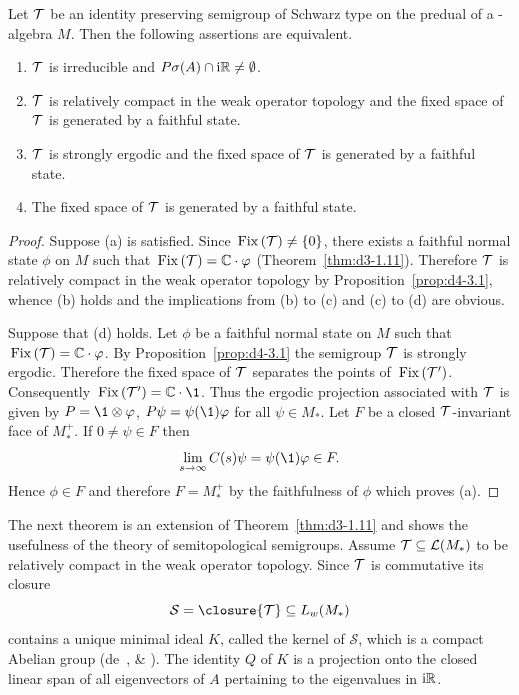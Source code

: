 \begin{proposition}\label{prop:d4-3.4}
Let $\mathcal{T}$ be an identity preserving semigroup of Schwarz type on the predual of a \WA-algebra $M$.
Then the following assertions are equivalent.
\begin{enumerate}[\upshape (a)]
\item
$\mathcal{T}$ is irreducible and $P\sigma(A) \cap \mathrm{i}\mathbb{R} \neq \emptyset$.

\item
$\mathcal{T}$ is relatively compact in the weak operator topology and the fixed space of\/ $\mathcal{T}$ is generated by a faithful state.

\item
$\mathcal{T}$ is strongly ergodic and the fixed space of\/ $\mathcal{T}$ is generated by a faithful state.

\item
The fixed space of\/ $\mathcal{T}$ is generated by a faithful state.
\end{enumerate}
\end{proposition}
\begin{proof}
Suppose (a) is satisfied.
Since $\mathop{}\mathrm{Fix}\left(\mathcal{T}\right) \neq \{0\}$, there exists a faithful normal state $\phi$ on $M$ such that 
$\Fix{\TT} = \C \cdot \phi$ (Theorem~\ref{thm:d3-1.11}).
Therefore $\mathcal{T}$ is relatively compact in the weak operator topology by Proposition~\ref{prop:d4-3.1}, whence (b) holds and the  implications from (b) to (c) and (c) to (d) are obvious.

Suppose that (d) holds.
Let $\phi$ be a faithful normal state on $M$ such that $\Fix{\TT} = \C \cdot \phi$.
By Proposition~\ref{prop:d4-3.1} the semigroup $\mathcal{T}$ is strongly ergodic.
Therefore the fixed space of\/ $\mathcal{T}$ separates the points of\/ $\mathop{}\mathrm{Fix}\left(\mathcal{T}'\right)$.
Consequently $\Fix{\TT'} = \C \cdot \1$.
Thus the ergodic projection associated with $\mathcal{T}$ is given by $P = \1 \otimes \phi$, \ie $P\psi = \psi(\1)\phi$ for all $\psi \in M_{*}$.
Let $F$ be a closed $\mathcal{T}$-invariant face of\/ $M_{*}^{+}$.
If\/ $0 \neq \psi \in F$ then
\[
\lim_{s \to \infty} C(s)\psi = \psi(\1)\phi \in F.
\]
Hence $\phi \in F$ and therefore $F = M_{*}^{+}$ by the faithfulness of\/ $\phi$ which proves (a).
\end{proof}
The next theorem is an extension of Theorem~\ref{thm:d3-1.11} and shows the usefulness of the theory of semitopological semigroups.
Assume $\mathcal{T} \subseteq \mathcal{L}(M_{*})$ to be relatively compact in the weak operator topology. 
Since $\mathcal{T}$ is commutative its closure 
\[
\mathcal{S}  = \closure{\TT} \subseteq L_{w}(M_{*})
\]
contains a unique minimal ideal $K$, called the kernel of\/ $\mathcal{S}$, which is a compact Abelian group (de~\textcite{deleeuw:1961}, \textcite{junghenn:1971} \& \textcite[§ 2.4]{krengel:1985}).
The identity $Q$ of\/ $K$ is a projection onto the closed linear span of all eigenvectors of\/ $ A $ pertaining to the eigenvalues in $ \mathrm{i}  \mathbb{R} $. 

